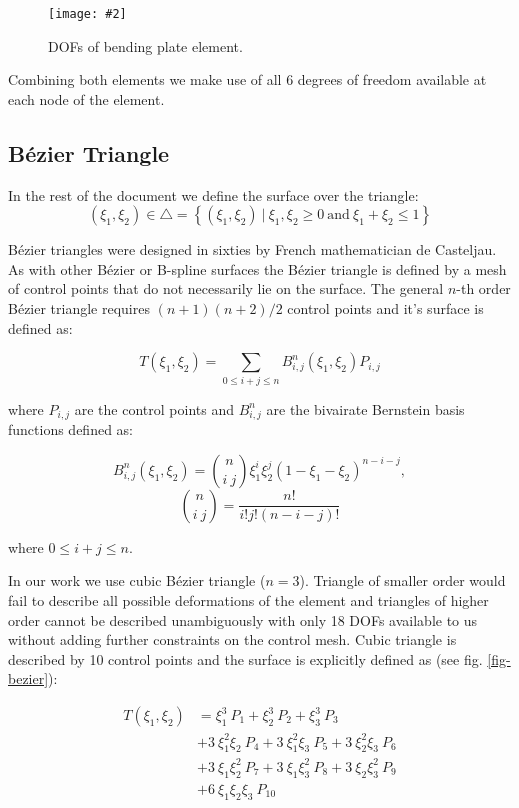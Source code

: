 \documentclass{egpubl}
\newcommand{\Figure}[3]{%
\begin{figure}[htb]
  \centering
  \texttt{[image: \#2]}
  \caption{\label{fig-#2}#3}
\end{figure}}
\begin{document}
\Figure{0.8\linewidth}{plate}
{DOFs of bending plate element.}

Combining both elements we make use of all 6 degrees of freedom available
at each node of the element.


\subsection{Bézier Triangle} %

In the rest of the document we define the surface over the triangle:
\begin{equation}
    (\xi_1,\xi_2) \in \bigtriangleup = \left\{ (\xi_1,\xi_2)~|~\xi_1, \xi_2 \ge 0
        \mathrm{~and~} \xi_1+\xi_2 \le 1 \right\}
\end{equation}

Bézier triangles were designed in sixties by French mathematician de
Casteljau. As with other Bézier or B-spline surfaces the Bézier triangle is
defined by a mesh of control points that do not necessarily lie on the
surface. The general $n$-th order Bézier triangle requires $(n + 1)(n +
2)/2$ control points and it's surface is defined as:

\begin{equation}
    T(\xi_1, \xi_2) = \sum_{0 \le i + j \le n} B^n_{i,j}(\xi_1,\xi_2) P_{i,j}
\end{equation}

\noindent
where $P_{i,j}$ are the control points and $B^n_{i,j}$ are the bivairate
Bernstein basis functions defined as:

\begin{equation}
  B^n_{i,j} (\xi_1,\xi_2) =
    \binom{n}{i~j} \xi_1^i \xi_2^j (1-\xi_1-\xi_2)^{n-i-j},
\end{equation}
\begin{equation}
  \binom{n}{i~j} = \frac{n!}{i!j!(n-i-j)!}
\end{equation}

\noindent
where $ 0 \le i+j \le n $.

In our work we use cubic Bézier triangle ($n=3$). Triangle of smaller order
would fail to describe all possible deformations of the element and
triangles of higher order cannot be described unambiguously with only 18
DOFs available to us without adding further constraints on the control
mesh. Cubic triangle is described by 10 control points and the surface is
explicitly defined as (see fig. \ref{fig-bezier}):

\begin{equation}\label{eq-cubicbez}
  \begin{split}
  T(\xi_1,\xi_2) & =
             \xi_1^3\ P_1
           + \xi_2^3\ P_2
           + \xi_3^3\ P_3 \\
         & + 3\ \xi_1^2 \xi_2\ P_4
           + 3\ \xi_1^2 \xi_3\ P_5
           + 3\ \xi_2^2 \xi_3\ P_6 \\
         & + 3\ \xi_1 \xi_2^2\ P_7
           + 3\ \xi_1 \xi_3^2\ P_8
           + 3\ \xi_2 \xi_3^2\ P_9 \\
         & + 6\ \xi_1 \xi_2 \xi_3\ P_{10} \\
  \end{split}
\end{equation}
\end{document}
